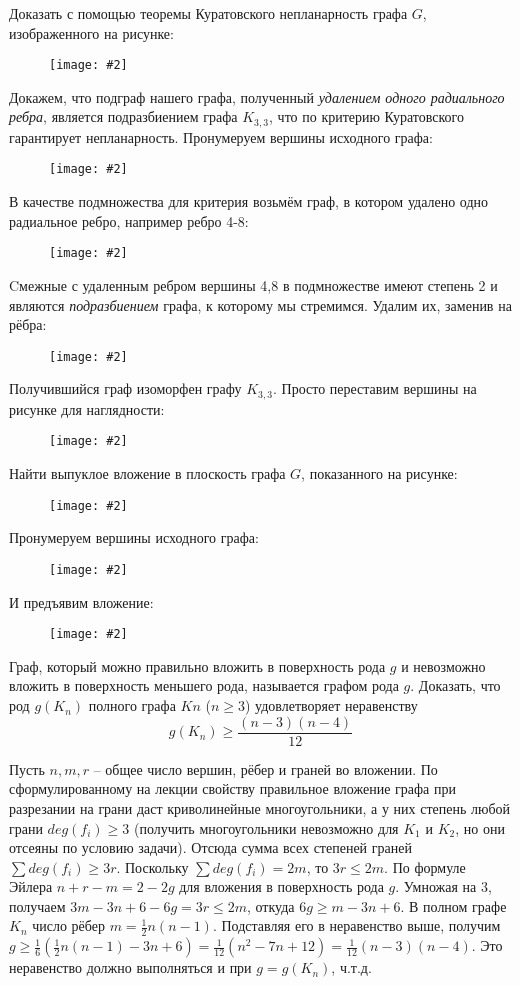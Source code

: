 \documentclass[a4paper,12pt]{article}
\numberwithin{figure}{section}
\newcommand\CenterFigure[2]{
	\begin{figure}[H]
		\centering
		\texttt{[image: \#2]}
	\end{figure}
}
\begin{document}
\begin{problem}
	Доказать с помощью теоремы Куратовского непланарность графа $G$, изображенного на рисунке:
		\CenterFigure{4cm}{kuratovsky-task2-stage0-8angles.png}
\end{problem}
\begin{solution}
	Докажем, что подграф нашего графа, полученный \textit{удалением одного радиального ребра}, является подразбиением графа $K_{3,3}$, что по критерию Куратовского гарантирует непланарность.
	Пронумеруем вершины исходного графа:
		\CenterFigure{6cm}{kuratovsky-task2-stage1.png}
	В качестве подмножества для критерия возьмём граф, в котором удалено одно радиальное ребро, например ребро 4-8:
		\CenterFigure{6cm}{kuratovsky-task2-stage2.png}
	Cмежные с удаленным ребром вершины 4,8 в подмножестве имеют степень 2 и являются \textit{подразбиением} графа, к которому мы стремимся. Удалим их, заменив на рёбра:
		\CenterFigure{6cm}{kuratovsky-task2-stage3.png}
	Получившийся граф изоморфен графу $K_{3,3}$. Просто переставим вершины на рисунке для наглядности:
		\CenterFigure{6cm}{kuratovsky-task2-stage4.png}
\end{solution}



\begin{problem}
	Найти выпуклое вложение в плоскость графа $G$, показанного на рисунке:
		\CenterFigure{4cm}{kuratovsky-task3-stage0.png}
\end{problem}
\begin{solution}
	Пронумеруем вершины исходного графа:
		\CenterFigure{7cm}{kuratovsky-task3-stage1.png}
	И предъявим вложение:
		\CenterFigure{9cm}{kuratovsky-task3-stage2.png}
\end{solution}



\begin{problem}
	Граф, который можно правильно вложить в поверхность рода $g$ и невозможно вложить в поверхность меньшего рода, называется графом рода $g$. Доказать, что род $g(K_n)$ полного графа $Kn$ ($n \ge 3$) удовлетворяет неравенству
	\[ g(K_n) \ge \frac{(n-3)(n-4)}{12} \]
\end{problem}
\begin{solution}
	Пусть $n,m,r$ -- общее число вершин, рёбер и граней во вложении.
	По сформулированному на лекции свойству правильное вложение графа при разрезании на грани даст криволинейные многоугольники, а у них степень любой грани $deg(f_i) \geqslant 3$ (получить многоугольники невозможно для $K_1$ и $K_2$, но они отсеяны по условию задачи).
	Отсюда сумма всех степеней граней $\sum{deg(f_i)} \geqslant 3r$. Поскольку $\sum{deg(f_i)} = 2m$, то $3r \leqslant 2m$.
	По формуле Эйлера $n+r-m = 2-2g$ для вложения в поверхность рода $g$. Умножая на 3, получаем $3m-3n+6-6g=3r \leqslant 2m$, откуда $6g \geqslant m-3n+6$.
	В полном графе $K_n$ число рёбер $m=\frac{1}{2}n(n-1)$. Подставляя его в неравенство выше, получим $g \geqslant \frac{1}{6}\left( \frac{1}{2} n(n-1)-3n+6 \right) = \frac{1}{12}(n^2-7n+12) = \frac{1}{12}(n-3)(n-4)$.
	Это неравенство должно выполняться и при $g=g(K_n)$, ч.т.д.
\end{solution}
\end{document}
